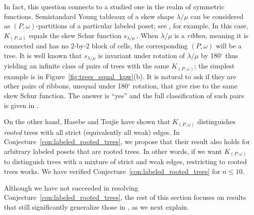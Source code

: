 \documentclass[ALCO,Unicode,published]{cedram}
\newcommand{\om}{\omega}
\newcommand{\kpw}{K_{(P,\om)}}
\begin{document}
In fact, this question connects to a studied one in the realm of symmetric functions.  Semistandard Young tableaux of a skew shape $\lambda/\mu$ can be considered as $(P,\om)$-partitions of a particular labeled poset; see \cite[\S7.19]{Sta99}, for example.  In this case, $\kpw$ equals the skew Schur function $s_{\lambda/\mu}$\,.  When $\lambda/\mu$ is a \emph{ribbon}, meaning it is connected and has no 2-by-2 block of cells, the corresponding $(P,\om)$ will be a tree.  It is well known that $s_{\lambda/\mu}$ is invariant under rotation of $\lambda/\mu$ by 180$^\circ$ thus yielding an infinite class of pairs of trees with the same $\kpw$; the simplest example is in Figure~\ref{fig:trees_equal_kpw}(b).  It is natural to ask if they are other pairs of ribbons, unequal under 180$^\circ$ rotation, that give rise to the same skew Schur function. The answer is ``yes'' and the full classification of such pairs is given in \cite{BTvW06}.

On the other hand, Hasebe and Tsujie \cite{HaTs17} have shown that $\kpw$ distinguishes \emph{rooted} trees with all strict (equivalently all weak) edges.  In Conjecture~\ref{con:labeled_rooted_trees}, we propose that their result also holds for arbitrary labeled posets that are rooted trees.  In other words, if we want $\kpw$ to distinguish trees with a mixture of strict and weak edges, restricting to rooted trees works.  We have verified Conjecture~\ref{con:labeled_rooted_trees} for $n\leq 10$.

Although we have not succeeded in resolving Conjecture~\ref{con:labeled_rooted_trees}, the rest of this section focuses on results that still significantly generalize those in \cite{HaTs17}, as we next explain.   
\end{document}
